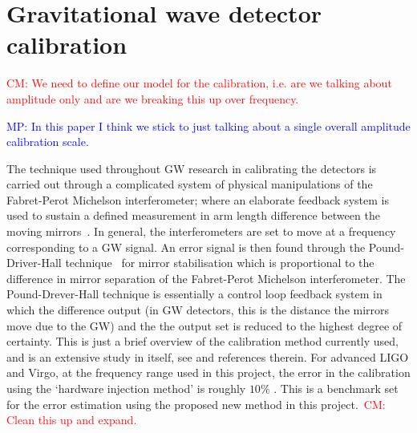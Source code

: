 \documentclass[10pt]{iopart}
\newcommand{\cm}[1]{\textcolor{red}{CM: #1}}
\newcommand{\MP}[1]{\textcolor{blue}{MP: #1}}
\begin{document}
\section{Gravitational wave detector calibration\label{sec:calibration}}

\cm{We need to define our model for the calibration, i.e. are we talking
about amplitude only and are we breaking this up over frequency.}

\MP{In this paper I think we stick to just talking about a single overall amplitude calibration scale.}

The technique used throughout GW research in calibrating the detectors is
carried out through a complicated system of physical manipulations of the
Fabret-Perot Michelson interferometer; where an elaborate feedback system is
used to sustain a defined measurement in arm length difference between the
moving mirrors~\cite{LIGOCal}. In general, the interferometers are set to move
at a frequency corresponding to a GW signal. An error signal is then found
through the Pound-Driver-Hall technique~\cite{Black} for mirror stabilisation
which is proportional to the difference in mirror separation of the
Fabret-Perot Michelson interferometer. The Pound-Drever-Hall technique is
essentially a control loop feedback system in which the difference output (in
GW detectors, this is the distance the mirrors move due to the GW) and the the
output set is reduced to the highest degree of certainty. This is just a brief
overview of the calibration method currently used, and is an extensive study in
itself, see \cite{Vitale:2012} and references therein. For advanced LIGO and Virgo,
at the frequency range used in this project, the error in the calibration using
the `hardware injection method' is roughly $10\%$ \cite{Vitale:2012}. This is a
benchmark set for the error estimation using the proposed new method in this
project.~\cm{Clean this up and expand.}
\end{document}
